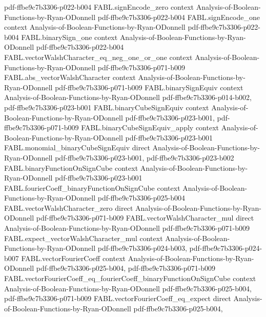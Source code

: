 \begin{theorem}
  {pdf-ffbe9c7b3306-p022-b004}
\proofstep
  {FABL.signEncode_zero}
  {context}
  {Analysis-of-Boolean-Functions-by-Ryan-ODonnell}
  {pdf-ffbe9c7b3306-p022-b004}
\proofstep
  {FABL.signEncode_one}
  {context}
  {Analysis-of-Boolean-Functions-by-Ryan-ODonnell}
  {pdf-ffbe9c7b3306-p022-b004}
\proofstep
  {FABL.binarySign_one}
  {context}
  {Analysis-of-Boolean-Functions-by-Ryan-ODonnell}
  {pdf-ffbe9c7b3306-p022-b004}
\proofstep
  {FABL.vectorWalshCharacter_eq_neg_one_or_one}
  {context}
  {Analysis-of-Boolean-Functions-by-Ryan-ODonnell}
  {pdf-ffbe9c7b3306-p071-b009}
\proofstep
  {FABL.abs_vectorWalshCharacter}
  {context}
  {Analysis-of-Boolean-Functions-by-Ryan-ODonnell}
  {pdf-ffbe9c7b3306-p071-b009}
\proofstep
  {FABL.binarySignEquiv}
  {context}
  {Analysis-of-Boolean-Functions-by-Ryan-ODonnell}
  {pdf-ffbe9c7b3306-p014-b002,
    pdf-ffbe9c7b3306-p023-b001}
\proofstep
  {FABL.binaryCubeSignEquiv}
  {context}
  {Analysis-of-Boolean-Functions-by-Ryan-ODonnell}
  {pdf-ffbe9c7b3306-p023-b001,
    pdf-ffbe9c7b3306-p071-b009}
\proofstep
  {FABL.binaryCubeSignEquiv_apply}
  {context}
  {Analysis-of-Boolean-Functions-by-Ryan-ODonnell}
  {pdf-ffbe9c7b3306-p023-b001}
\proofstep
  {FABL.monomial_binaryCubeSignEquiv}
  {direct}
  {Analysis-of-Boolean-Functions-by-Ryan-ODonnell}
  {pdf-ffbe9c7b3306-p023-b001,
    pdf-ffbe9c7b3306-p023-b002}
\proofstep
  {FABL.binaryFunctionOnSignCube}
  {context}
  {Analysis-of-Boolean-Functions-by-Ryan-ODonnell}
  {pdf-ffbe9c7b3306-p023-b001}
\proofstep
  {FABL.fourierCoeff_binaryFunctionOnSignCube}
  {context}
  {Analysis-of-Boolean-Functions-by-Ryan-ODonnell}
  {pdf-ffbe9c7b3306-p025-b004}
\proofstep
  {FABL.vectorWalshCharacter_zero}
  {direct}
  {Analysis-of-Boolean-Functions-by-Ryan-ODonnell}
  {pdf-ffbe9c7b3306-p071-b009}
\proofstep
  {FABL.vectorWalshCharacter_mul}
  {direct}
  {Analysis-of-Boolean-Functions-by-Ryan-ODonnell}
  {pdf-ffbe9c7b3306-p071-b009}
\proofstep
  {FABL.expect_vectorWalshCharacter_mul}
  {context}
  {Analysis-of-Boolean-Functions-by-Ryan-ODonnell}
  {pdf-ffbe9c7b3306-p024-b003,
    pdf-ffbe9c7b3306-p024-b007}
\proofstep
  {FABL.vectorFourierCoeff}
  {context}
  {Analysis-of-Boolean-Functions-by-Ryan-ODonnell}
  {pdf-ffbe9c7b3306-p025-b004,
    pdf-ffbe9c7b3306-p071-b009}
\proofstep
  {FABL.vectorFourierCoeff_eq_fourierCoeff_binaryFunctionOnSignCube}
  {context}
  {Analysis-of-Boolean-Functions-by-Ryan-ODonnell}
  {pdf-ffbe9c7b3306-p025-b004,
    pdf-ffbe9c7b3306-p071-b009}
\proofstep
  {FABL.vectorFourierCoeff_eq_expect}
  {direct}
  {Analysis-of-Boolean-Functions-by-Ryan-ODonnell}
  {pdf-ffbe9c7b3306-p025-b004,
}
\end{theorem}
